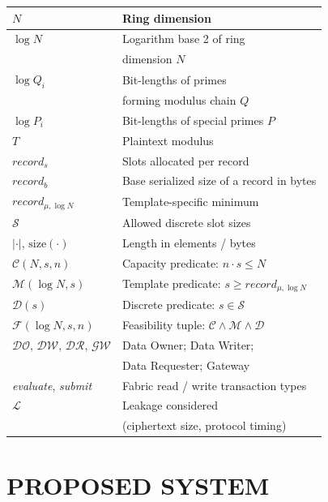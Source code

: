 \documentclass{ieeetj}
\begin{document}
\begin{table}[!ht]
\begin{tabular}{|l|l|}
    \hline
    $N$ & Ring dimension \\
    \hline
    $\log N$ & Logarithm base 2 of ring \\ & dimension $N$ \\
    \hline
    $\log Q_i$ & Bit-lengths of primes \\ & forming modulus chain $Q$ \\
    \hline
    $\log P_i$ & Bit-lengths of special primes $P$ \\
    \hline
    $T$ & Plaintext modulus \\
    \hline
    $record_s$ & Slots allocated per record \\
    \hline
    $record_b$ & Base serialized size of a record in bytes \\
    \hline
    $record_{\mu,\log N}$ & Template-specific minimum \\
    \hline
    $\mathcal{S}$ & Allowed discrete slot sizes \\
    \hline
    $|\cdot|$, $\mathrm{size}(\cdot)$ & Length in elements / bytes \\
    \hline
    $\mathcal{C}(N,s,n)$ & Capacity predicate: $n \cdot s \leq N$ \\
    \hline
    $\mathcal{M}(\log N,s)$ & Template predicate: $s \geq record_{\mu,\log N}$ \\
    \hline
    $\mathcal{D}(s)$ & Discrete predicate: $s \in \mathcal{S}$ \\
    \hline
    $\mathcal{F}(\log N,s,n)$ & Feasibility tuple: $\mathcal{C} \wedge \mathcal{M} \wedge \mathcal{D}$ \\
    \hline
    $\mathcal{DO},\,\mathcal{DW},\,\mathcal{DR},\,\mathcal{GW}$ & Data Owner; Data Writer; \\ & Data Requester; Gateway \\
    \hline
    \emph{evaluate}, \emph{submit} & Fabric read / write transaction types \\
    \hline
    $\mathcal{L}$ & Leakage considered \\ & (ciphertext size, protocol timing) \\
    \hline
    \end{tabular}
\end{table}
    
\section{PROPOSED SYSTEM}\label{sec:proposed_system}
\end{document}
